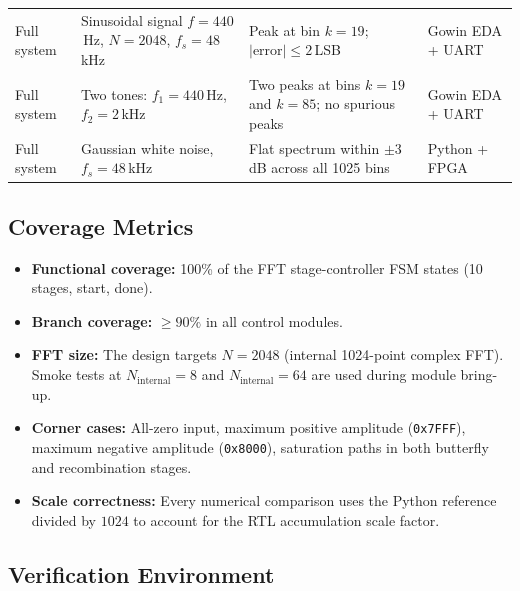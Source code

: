 \documentclass[12pt, a4paper]{article}
\begin{document}
\begin{longtable}{p{2.8cm} p{4.2cm} p{4.8cm} p{2.6cm}}
    Full system
        & Sinusoidal signal $f{=}440$\,Hz, $N{=}2048$, $f_s{=}48$\,kHz
        & Peak at bin $k{=}19$; $|\text{error}| \leq 2$\,LSB
        & Gowin EDA + UART \\[3pt]

    Full system
        & Two tones: $f_1{=}440$\,Hz, $f_2{=}2$\,kHz
        & Two peaks at bins $k{=}19$ and $k{=}85$; no spurious peaks
        & Gowin EDA + UART \\[3pt]

    Full system
        & Gaussian white noise, $f_s{=}48$\,kHz
        & Flat spectrum within $\pm 3$\,dB across all 1025 bins
        & Python + FPGA \\

\end{longtable}

\subsection{Coverage Metrics}

\begin{itemize}
    \item \textbf{Functional coverage:} 100\% of the FFT stage-controller FSM
          states (10 stages, start, done).
    \item \textbf{Branch coverage:} $\geq 90\%$ in all control modules.
    \item \textbf{FFT size:} The design targets $N = 2048$ (internal
          1024-point complex FFT). Smoke tests at $N_\text{internal} = 8$
          and $N_\text{internal} = 64$ are used during module bring-up.
    \item \textbf{Corner cases:} All-zero input, maximum positive amplitude
          (\texttt{0x7FFF}), maximum negative amplitude (\texttt{0x8000}),
          saturation paths in both butterfly and recombination stages.
    \item \textbf{Scale correctness:} Every numerical comparison uses the
          Python reference divided by $1024$ to account for the RTL
          accumulation scale factor.
\end{itemize}

\subsection{Verification Environment}
\end{document}
